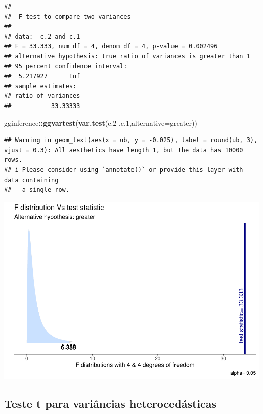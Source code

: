 \documentclass[
]{book}
\newenvironment{Shaded}{\begin{snugshade}}{\end{snugshade}}
\newcommand{\AttributeTok}[1]{\textcolor[rgb]{0.13,0.29,0.53}{#1}}
\newcommand{\FloatTok}[1]{\textcolor[rgb]{0.00,0.00,0.81}{#1}}
\newcommand{\FunctionTok}[1]{\textcolor[rgb]{0.13,0.29,0.53}{\textbf{#1}}}
\newcommand{\NormalTok}[1]{#1}
\newcommand{\SpecialCharTok}[1]{\textcolor[rgb]{0.81,0.36,0.00}{\textbf{#1}}}
\newcommand{\StringTok}[1]{\textcolor[rgb]{0.31,0.60,0.02}{#1}}
\begin{document}
\begin{verbatim}
## 
##  F test to compare two variances
## 
## data:  c.2 and c.1
## F = 33.333, num df = 4, denom df = 4, p-value = 0.002496
## alternative hypothesis: true ratio of variances is greater than 1
## 95 percent confidence interval:
##  5.217927      Inf
## sample estimates:
## ratio of variances 
##           33.33333
\end{verbatim}

\begin{Shaded}
\begin{Highlighting}[]
\NormalTok{ gginference}\SpecialCharTok{::}\FunctionTok{ggvartest}\NormalTok{(}\FunctionTok{var.test}\NormalTok{(c}\FloatTok{.2}\NormalTok{ ,c}\FloatTok{.1}\NormalTok{,}\AttributeTok{alternative=}\StringTok{\textquotesingle{}greater\textquotesingle{}}\NormalTok{))}
\end{Highlighting}
\end{Shaded}

\begin{verbatim}
## Warning in geom_text(aes(x = ub, y = -0.025), label = round(ub, 3), vjust = 0.3): All aesthetics have length 1, but the data has 10000 rows.
## i Please consider using `annotate()` or provide this layer with data containing
##   a single row.
\end{verbatim}

\includegraphics{_main_files/figure-latex/vartest1-1.pdf}

\subsection{Teste t para variâncias heterocedásticas}\label{teste-t-para-variuxe2ncias-heteroceduxe1sticas}
\end{document}
